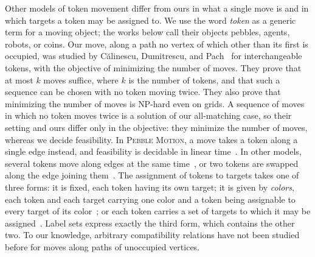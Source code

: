 \documentclass[a4paper,USenglish,thm-restate]{lipics-v2021}
\theoremstyle{problemstyle}
\begin{document}
Other models of token movement differ from ours in what a single move is
and in which targets a token may be assigned to. We use the word
\emph{token} as a generic term for a moving object; the works below call
their objects pebbles, agents, robots, or coins. Our move, along a path no
vertex of which other than its first is occupied, was studied by C\u{a}linescu, Dumitrescu, and
Pach~\cite{Calinescu2008Reconfigurations} for interchangeable tokens, with
the objective of minimizing the number of moves. They prove that at most $k$ moves suffice, where $k$ is the number of
tokens, and that such a sequence can be chosen with no token moving twice.
They also prove that minimizing the number of moves is \textsf{NP}-hard even on
grids. A sequence of moves in which no token moves twice is a solution of our
all-matching case, so their setting and ours differ only in the objective: they
minimize the number of moves, whereas we decide feasibility. In \textsc{Pebble Motion}, a move takes a token along
a single edge instead, and feasibility is decidable in linear
time~\cite{Kornhauser1984PebbleMotion,Auletta1999PebbleTrees,%
Yu2013LinearPebble,Goraly2010MulticolorPebble}. In other models, several
tokens move along edges at the same
time~\cite{YuLaValle2016OptimalMPP,Stern2019MAPFDefinitions,Ma2022GraphMAPF,%
Kedia2022PCMAPF,Surynek2019CapacityMAPF,Chong2024TAPFPTC}, or two tokens are
swapped along the edge joining
them~\cite{Yamanaka2015SwappingLabeled,Miltzow2016Approximation,%
Alon1994RoutingMatchings,Kawahara2019PermutationRouting}. The assignment of
tokens to targets takes one of three forms: it is fixed, each token having
its own target; it is given by \emph{colors}, each token and each target
carrying one color and a token being assignable to every target of its
color~\cite{Goraly2010MulticolorPebble,MaKoenig2016TAPF,Bonnet2017Complexity,%
Geft2026Trees}; or each token carries a set of targets to which it may be
assigned~\cite{Bonnet2017Complexity,DBLP:journals/comgeo/AbellanasBHORT06}.
Label sets express exactly the third form, which contains the other two.
To our knowledge, arbitrary compatibility relations have not been studied
before for moves along paths of unoccupied vertices.
\end{document}
